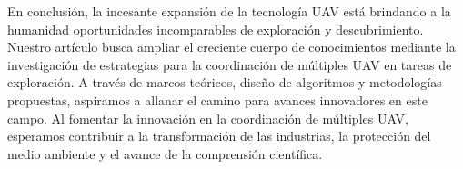 \documentclass[sigconf]{acmart}
\begin{document}

En conclusión, la incesante expansión de la tecnología UAV está brindando a la humanidad oportunidades incomparables de exploración y descubrimiento. Nuestro artículo busca ampliar el creciente cuerpo de conocimientos mediante la investigación de estrategias para la coordinación de múltiples UAV en tareas de exploración. A través de marcos teóricos, diseño de algoritmos y metodologías propuestas, aspiramos a allanar el camino para avances innovadores en este campo. Al fomentar la innovación en la coordinación de múltiples UAV, esperamos contribuir a la transformación de las industrias, la protección del medio ambiente y el avance de la comprensión científica.\\





\end{document}
